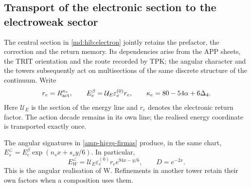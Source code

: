 \subsection{Transport of the electronic section to the electroweak sector}
\label{amp-ew-seccion}

The central section in \eqref{md:hib:electron} jointly retains the
prefactor, the correction and the return memory. Its dependencies arise
from the APP sheets, the TRIT orientation and the route recorded by TPK;
the angular character and the towers subsequently act on multisections
of the same discrete structure of the continuum. Write
\begin{equation}
 r_e=R_{\rm act}^{\kappa_e},\qquad
 E_e^\beta=\mathcal U_E\varepsilon_e^{(0)}r_e,\qquad
 \kappa_e=80-54\alpha+6\Delta_4.
 \label{amp-ew-electron}
\end{equation}
Here $\mathcal U_E$ is the section of the energy line and $r_e$ denotes
the electronic return factor. The action decade remains in its own line;
the realised energy coordinate is transported exactly once.

The angular signatures in \eqref{amp-higgs-firmas} produce, in the same
chart, $E_s^\angle=E_e^\beta\exp(n_sx+s_sy/6)$. In particular,
\begin{equation}
 E_W^\angle=\mathcal U_E\varepsilon_e^{(0)}r_e
                  e^{94x-y/6},\qquad D=e^{-2x}.
 \label{amp-ew-w}
\end{equation}
This is the angular realisation of W. Refinements in another tower
retain their own factors when a composition uses them.

